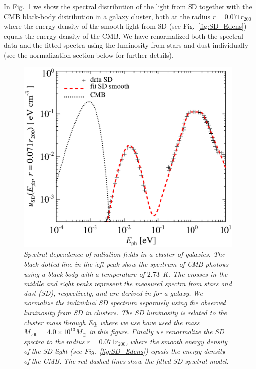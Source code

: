 \documentclass[10pt,aps,pra,reprint,amsmath,amsfonts,amssymb,showpacs]{revtex4-1}
\newcommand{\msun}{M_\odot}
\newcommand{\rvir}{r_{200}}
\newcommand{\mvir}{M_{200}}
\begin{document}
In Fig.~\ref{fig:SD_spectra} we show the spectral distribution of the
light from SD together with the CMB black-body distribution in a
galaxy cluster, both at the radius $r=0.071\rvir$ where the energy
density of the smooth light from SD (see Fig.~\ref{fig:SD_Edens})
equals the energy density of the CMB. We have renormalized both the
spectral data and the fitted spectra using the luminosity from stars
and dust individually (see the normalization section below for further
details).
\begin{figure}%
 \includegraphics[width=0.99\columnwidth]{figures/fit.porter.v2.eps}
\caption{\it Spectral dependence of radiation fields in a cluster of
  galaxies. The black dotted line in the left peak show the spectrum
  of CMB photons using a black body with a temperature of
  $2.73$~K. The crosses in the middle and right peaks represent the
  measured spectra from stars and dust (SD), respectively, and are
  derived in \cite{2006ApJ...648L..29P} for a galaxy. We normalize the
  individual SD spectrum separately using the observed luminosity from
  SD in clusters. The SD luminosity is related to the cluster mass
  through Eq, where we use have used the mass
  $\mvir=4.0\times10^{13}\msun$ in this figure. Finally we renormalize
  the SD spectra to the radius $r=0.071\rvir$, where the smooth energy
  density of the SD light (see Fig.~\ref{fig:SD_Edens}) equals the
  energy density of the CMB. The red dashed lines show the fitted SD
  spectral model.}
 \label{fig:SD_spectra}
\end{figure}
\end{document}
